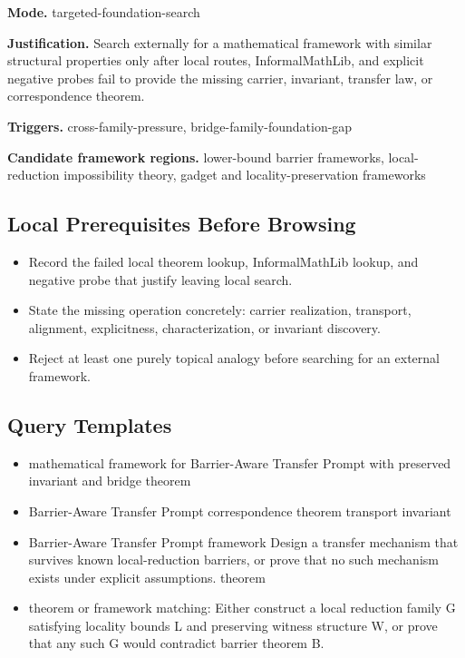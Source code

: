 \documentclass[11pt]{article}
\begin{document}
\textbf{Mode.} targeted-foundation-search

\textbf{Justification.} Search externally for a mathematical framework with similar structural properties only after local routes, InformalMathLib, and explicit negative probes fail to provide the missing carrier, invariant, transfer law, or correspondence theorem.

\textbf{Triggers.} cross-family-pressure, bridge-family-foundation-gap

\textbf{Candidate framework regions.} lower-bound barrier frameworks, local-reduction impossibility theory, gadget and locality-preservation frameworks

\subsection*{Local Prerequisites Before Browsing}
\begin{itemize}[leftmargin=*,itemsep=0.2em]
\item Record the failed local theorem lookup, InformalMathLib lookup, and negative probe that justify leaving local search.
\item State the missing operation concretely: carrier realization, transport, alignment, explicitness, characterization, or invariant discovery.
\item Reject at least one purely topical analogy before searching for an external framework.
\end{itemize}
\subsection*{Query Templates}
\begin{itemize}[leftmargin=*,itemsep=0.2em]
\item mathematical framework for Barrier-Aware Transfer Prompt with preserved invariant and bridge theorem
\item Barrier-Aware Transfer Prompt correspondence theorem transport invariant
\item Barrier-Aware Transfer Prompt framework Design a transfer mechanism that survives known local-reduction barriers, or prove that no such mechanism exists under explicit assumptions. theorem
\item theorem or framework matching: Either construct a local reduction family G satisfying locality bounds L and preserving witness structure W, or prove that any such G would contradict barrier theorem B.
\end{itemize}
\end{document}
